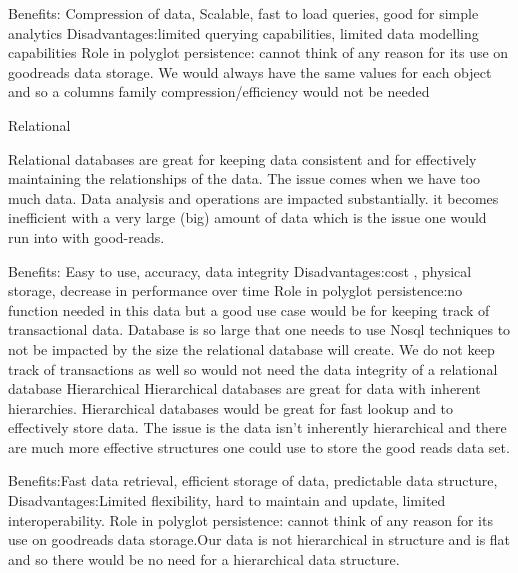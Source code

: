 \documentclass[11pt]{article}
\begin{document}
Benefits: Compression of data, Scalable, fast to load queries, good for simple analytics
Disadvantages:limited querying capabilities, limited data modelling capabilities
Role in polyglot persistence: cannot think of any reason for its use on goodreads data storage. We would always have the same values for each object and so a columns family compression/efficiency would not be needed

Relational

Relational databases are great for keeping data consistent and for effectively maintaining the relationships of the data. The issue comes when we have too much data. Data analysis and operations are impacted substantially. it becomes inefficient with a very large (big) amount of data which is the issue one would run into with good-reads.

Benefits: Easy to use, accuracy, data integrity
Disadvantages:cost , physical storage, decrease in performance over time
Role in polyglot persistence:no function needed in this data but a good use case would be for keeping track of transactional data. Database is so large that one needs to use Nosql techniques to not be impacted by the size the relational database will create. We do not keep track of transactions as well so would not need the data integrity of a relational database
Hierarchical
Hierarchical databases are great for data with inherent hierarchies. Hierarchical databases would be great for fast lookup and to effectively store data. The issue is the data isn't inherently hierarchical and there are much more effective structures one could use to store the good reads data set.

Benefits:Fast data retrieval, efficient storage of data, predictable data structure,
Disadvantages:Limited flexibility, hard to maintain and update, limited interoperability.
Role in polyglot persistence: cannot think of any reason for its use on goodreads data storage.Our data is not hierarchical in structure and is flat and so there would be no need for a hierarchical data structure.
\end{document}
